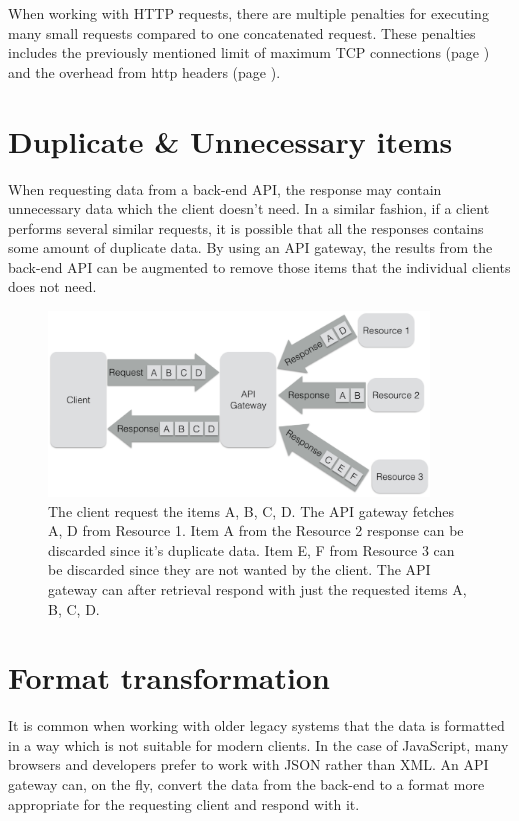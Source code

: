 \documentclass{cslthse-msc}
\begin{document}
When working with HTTP requests, there are multiple penalties for executing many small requests compared to one concatenated request. These penalties includes the previously mentioned limit of maximum TCP connections (page \pageref{max_tcp}) and the overhead from http headers (page \pageref{headers}).

\section{Duplicate \& Unnecessary items}
When requesting data from a back-end API, the response may contain unnecessary data which the client doesn't need. In a similar fashion, if a client performs several similar requests, it is possible that all the responses contains some amount of duplicate data. By using an API gateway, the results from the back-end API can be augmented to remove those items that the individual clients does not need.

\begin{figure}[H]
  \centering
    \begin{center}
      \includegraphics[width=0.9\textwidth]{images/api_gateway_duplicate.png}
    \end{center}
  \caption{The client request the items A, B, C, D. The API gateway fetches A, D from Resource 1. Item A from the Resource 2 response can be discarded since it's duplicate data. Item E, F from Resource 3 can be discarded since they are not wanted by the client. The API gateway can after retrieval respond with just the requested items A, B, C, D.}
\end{figure}

\section{Format transformation}
It is common when working with older legacy systems that the data is formatted in a way which is not suitable for modern clients. In the case of JavaScript, many browsers and developers prefer to work with JSON rather than XML. An API gateway can, on the fly, convert the data from the back-end to a format more appropriate for the requesting client and respond with it.
\end{document}
